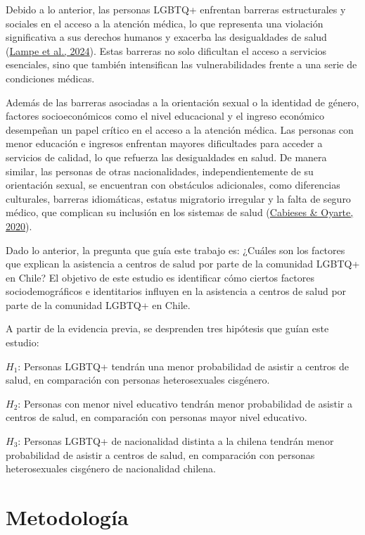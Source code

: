 \documentclass[
  12pt,
  a4paper,
]{article}
\begin{document}
Debido a lo anterior, las personas LGBTQ+ enfrentan barreras estructurales y sociales en el acceso a la atención médica, lo que representa una violación significativa a sus derechos humanos y exacerba las desigualdades de salud (\protect\hyperlink{ref-lampe2024health}{Lampe et al., 2024}). Estas barreras no solo dificultan el acceso a servicios esenciales, sino que también intensifican las vulnerabilidades frente a una serie de condiciones médicas.

Además de las barreras asociadas a la orientación sexual o la identidad de género, factores socioeconómicos como el nivel educacional y el ingreso económico desempeñan un papel crítico en el acceso a la atención médica. Las personas con menor educación e ingresos enfrentan mayores dificultades para acceder a servicios de calidad, lo que refuerza las desigualdades en salud. De manera similar, las personas de otras nacionalidades, independientemente de su orientación sexual, se encuentran con obstáculos adicionales, como diferencias culturales, barreras idiomáticas, estatus migratorio irregular y la falta de seguro médico, que complican su inclusión en los sistemas de salud (\protect\hyperlink{ref-cabieses2020health}{Cabieses \& Oyarte, 2020}).

Dado lo anterior, la pregunta que guía este trabajo es: ¿Cuáles son los factores que explican la asistencia a centros de salud por parte de la comunidad LGBTQ+ en Chile? El objetivo de este estudio es identificar cómo ciertos factores sociodemográficos e identitarios influyen en la asistencia a centros de salud por parte de la comunidad LGBTQ+ en Chile.

A partir de la evidencia previa, se desprenden tres hipótesis que guían este estudio:

\(H_1\): Personas LGBTQ+ tendrán una menor probabilidad de asistir a centros de salud, en comparación con personas heterosexuales cisgénero.

\(H_2\): Personas con menor nivel educativo tendrán menor probabilidad de asistir a centros de salud, en comparación con personas mayor nivel educativo.

\(H_3\): Personas LGBTQ+ de nacionalidad distinta a la chilena tendrán menor probabilidad de asistir a centros de salud, en comparación con personas heterosexuales cisgénero de nacionalidad chilena.

\hypertarget{metodologuxeda}{%
\section{Metodología}\label{metodologuxeda}}
\end{document}
